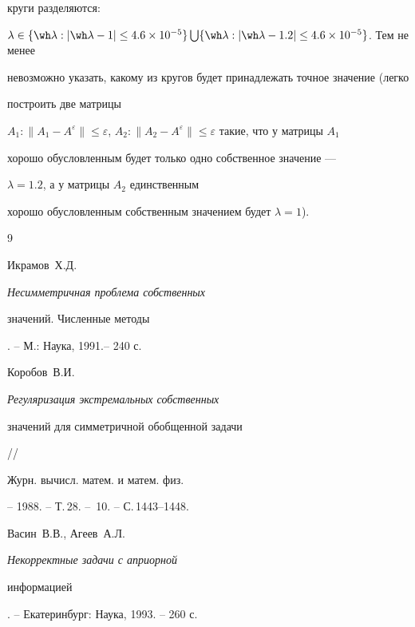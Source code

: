 \begin{exam}
круги разделяются:


$\lambda\in \{\wh\lambda:|\wh\lambda-1|\le 4.6\times 10^{-5}\}


\bigcup \{\wh\lambda:|\wh\lambda-1.2|\le 4.6\times 10^{-5}\}$. Тем не менее


невозможно указать, какому из кругов будет принадлежать точное значение (легко


построить две матрицы


$A_1:\|A_1-A^{\varepsilon}\|\le \varepsilon$, $A_2:\|A_2-


A^{\varepsilon}\|\le \varepsilon$ такие, что у матрицы $A_1$


хорошо обусловленным будет только одно собственное значение ---


$\lambda=1.2$, а у матрицы $A_2$ единственным


хорошо обусловленным собственным значением будет $\lambda=1$).


\end{exam}





\begin{thebibliography}{9}







Икрамов~Х.Д. {\it Несимметричная проблема собственных


значений. Численные методы}. -- М.: Наука, 1991.-- 240 с.




Коробов~В.И. {\it Регуляризация экстремальных собственных


значений для симметричной обобщенной задачи} //


Журн. вычисл. матем. и матем. физ.


-- 1988. -- Т.\,28. -- \No\,10. -- С.\,1443--1448.




Васин~В.В., Агеев~А.Л. {\it Некорректные задачи с априорной


информацией}. -- Екатеринбург: Наука, 1993. -- 260 с.





\end{thebibliography}





\vskip 2cm














\label{end}





